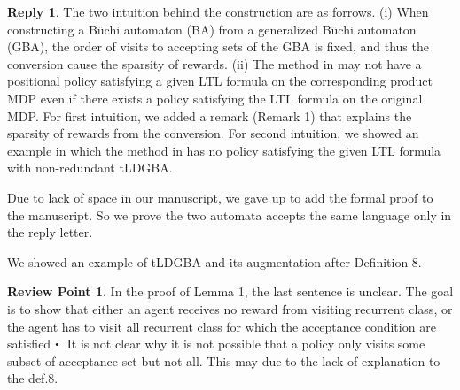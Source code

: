 \documentclass[10 pt, dvipdfmx]{article}
\theoremstyle{definition}
\newtheorem{review point}{Review Point}[section]
\newtheorem*{reply}{Reply}
\begin{document}
\begin{reply}
  The two intuition behind the construction are as forrows. (i) When constructing a B\"{u}chi automaton (BA) from a generalized B\"{u}chi automaton (GBA), the order of visits to accepting sets of the GBA is fixed, and thus the conversion cause the sparsity of rewards. (ii) The method in \cite{HAK2019, HKAKPL2019} may not have a positional policy satisfying a given LTL formula on the corresponding product MDP even if there exists a policy satisfying the LTL formula on the original MDP. For first intuition, we added a remark (Remark 1) that explains the sparsity of rewards from the conversion. For second intuition, we showed an example in which the method in \cite{HAK2019,HKAKPL2019} has no policy satisfying the given LTL formula with non-redundant tLDGBA.

  Due to lack of space in our manuscript, we gave up to add the formal proof to the manuscript. So we prove the two automata accepts the same language only in the reply letter.

  

  We showed an example of tLDGBA and its augmentation after Definition 8.
\end{reply}

\begin{review point}
  In the proof of Lemma 1, the last sentence is unclear. The goal is to
show that either an agent receives no reward from visiting recurrent
class, or the agent has to visit all recurrent class for which the
acceptance condition are satisfied・ It is not clear why it is not
possible that a policy only visits some subset of acceptance set but
not all. This may due to the lack of explanation to the def.8.
\end{review point}
\end{document}
